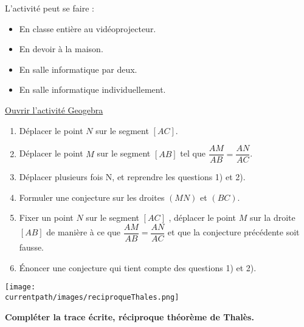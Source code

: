 \begin{activite}
    
        \begin{remarque}
            L'activité peut se faire :
            \begin{itemize}
                \item En classe entière au vidéoprojecteur.
                \item En devoir à la maison.
                \item En salle informatique par deux.
                \item En salle informatique individuellement.
            \end{itemize}
        \end{remarque}
        
        \href{https://www.geogebra.org/m/nztvwr9b}{ Ouvrir l'activité Geogebra}

        \begin{enumerate}
            \item Déplacer le point $N$ sur le segment $[AC]$.
            \item Déplacer le point $M$ sur le segment $[AB]$ tel que $\dfrac{AM}{AB}=\dfrac{AN}{AC}$.
            \item Déplacer plusieurs fois N, et reprendre les questions 1) et 2).
            \item Formuler une conjecture sur les droites $(MN)$ et $(BC)$.
            \item Fixer un point $N$ sur le segment $[AC]$ , déplacer le point $M$ sur la droite $[AB]$
            de manière à ce que $\dfrac{AM}{AB}=\dfrac{AN}{AC}$ et que la conjecture précédente soit fausse.
            \item Énoncer une conjecture qui tient compte des questions 1) et 2).
        \end{enumerate}

        \begin{center}
            \texttt{[image: \\currentpath/images/reciproqueThales.png]}
        \end{center}

        \textbf{Compléter la trace écrite, réciproque théorème de Thalès.}
\end{activite}